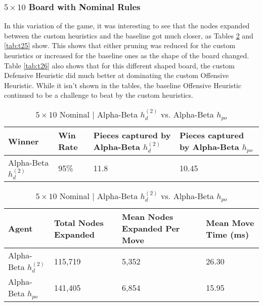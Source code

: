 \documentclass{article}[12pt]
\begin{document}
	\subsubsection{$5 \times 10$ Board with Nominal Rules}
	In this variation of the game, it was interesting to see that the nodes expanded between the custom heuristics and the baseline got much closer, as Tables \ref{tab:t23} and \ref{tab:t25} show. This shows that either pruning was reduced for the custom heuristics or increased for the baseline ones as the shape of the board changed. Table \ref{tab:t26} also shows that for this different shaped board, the custom Defensive Heuristic did much better at dominating the custom Offensive Heuristic. While it isn't shown in the tables, the baseline Offensive Heuristic continued to be a challenge to beat by the custom heuristics.
	
\begin{table}[ht]
	\centering
	\begin{tabular}{l | l | l | l}
		\hline
		Winner & Win Rate & Pieces captured by Alpha-Beta $h_{d}^{(2)}$ & Pieces captured by Alpha-Beta $h_{po}$ \\
		\hline \hline 
		Alpha-Beta $h_{d}^{(2)}$  & 95\% & 11.8 & 10.45 \\
		\hline
	\end{tabular}
	
	\vspace{10px}
	
	\begin{tabular}{l | l | l | l}
		\hline
		Agent & Total Nodes Expanded & Mean Nodes Expanded Per Move & Mean Move Time (ms) \\
		\hline \hline 
		Alpha-Beta $h_{d}^{(2)}$  & 115,719& 5,352& 26.30 \\
		Alpha-Beta $h_{po}$ & 141,405 & 6,854 & 15.95\\
		\hline
	\end{tabular}
	\caption{$5 \times 10$ Nominal | Alpha-Beta $h_{d}^{(2)}$ vs. Alpha-Beta $h_{po}$} \label{tab:t23}
\end{table}
\end{document}
